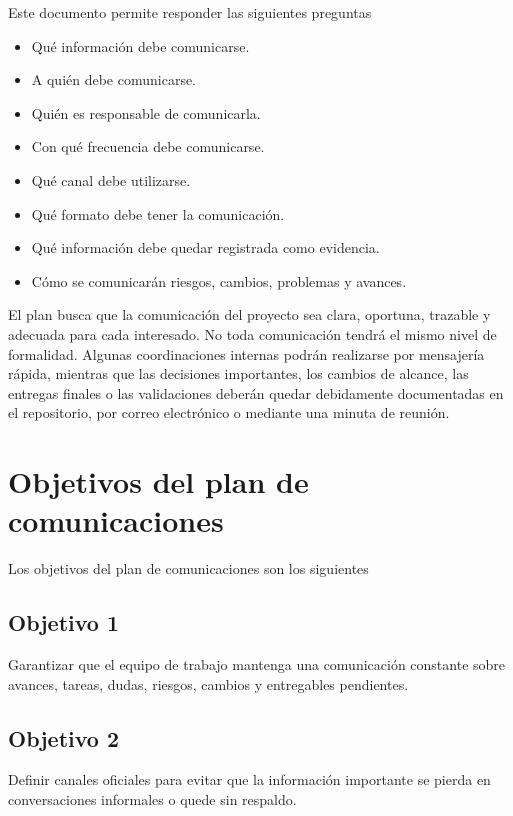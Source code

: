 \documentclass[11pt,spanish]{article}
\begin{document}
Este documento permite responder las siguientes preguntas

\begin{itemize}
    \item Qué información debe comunicarse.
    \item A quién debe comunicarse.
    \item Quién es responsable de comunicarla.
    \item Con qué frecuencia debe comunicarse.
    \item Qué canal debe utilizarse.
    \item Qué formato debe tener la comunicación.
    \item Qué información debe quedar registrada como evidencia.
    \item Cómo se comunicarán riesgos, cambios, problemas y avances.
\end{itemize}

El plan busca que la comunicación del proyecto sea clara, oportuna, trazable y adecuada para cada interesado. No toda comunicación tendrá el mismo nivel de formalidad. Algunas coordinaciones internas podrán realizarse por mensajería rápida, mientras que las decisiones importantes, los cambios de alcance, las entregas finales o las validaciones deberán quedar debidamente documentadas en el repositorio, por correo electrónico o mediante una minuta de reunión.

\section{Objetivos del plan de comunicaciones}

Los objetivos del plan de comunicaciones son los siguientes

\subsection{Objetivo 1}

Garantizar que el equipo de trabajo mantenga una comunicación constante sobre avances, tareas, dudas, riesgos, cambios y entregables pendientes.

\subsection{Objetivo 2}

Definir canales oficiales para evitar que la información importante se pierda en conversaciones informales o quede sin respaldo.
\end{document}
